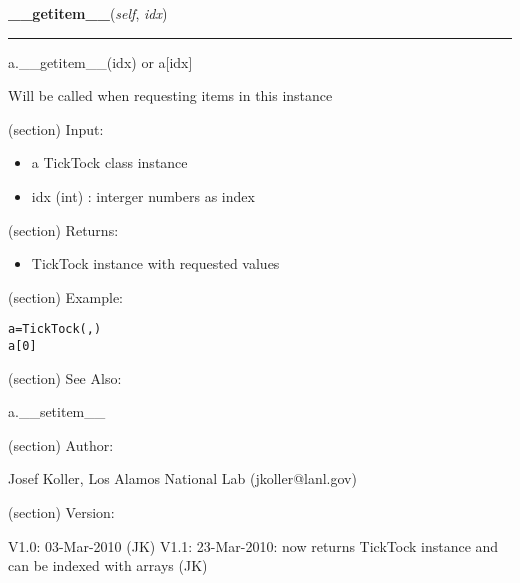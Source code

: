 \hspace{.8\funcindent}\begin{boxedminipage}{\funcwidth}

    \raggedright \textbf{\_\_getitem\_\_}(\textit{self}, \textit{idx})

    \vspace{-1.5ex}

    \rule{\textwidth}{0.5\fboxrule}
\setlength{\parskip}{2ex}
    a.\_\_getitem\_\_(idx) or a[idx]

    Will be called when requesting items in this instance

    (section) Input:

      \begin{itemize}
      \setlength{\parskip}{0.6ex}
        \item a TickTock class instance

        \item idx (int) : interger numbers as index

      \end{itemize}

    (section) Returns:

      \begin{itemize}
      \setlength{\parskip}{0.6ex}
        \item TickTock instance with requested values

      \end{itemize}

    (section) Example:

\begin{alltt}
\pysrcprompt{{\textgreater}{\textgreater}{\textgreater} }a = TickTock(, )
\pysrcprompt{{\textgreater}{\textgreater}{\textgreater} }a[0]
\end{alltt}
    (section) See Also:

      a.\_\_setitem\_\_

    (section) Author:

      Josef Koller, Los Alamos National Lab (jkoller@lanl.gov)

    (section) Version:

      V1.0: 03-Mar-2010 (JK) V1.1: 23-Mar-2010: now returns TickTock 
      instance and can be indexed with arrays (JK)

\setlength{\parskip}{1ex}
    \end{boxedminipage}

    \label{spacepy:spacetime:TickTock:__setitem__}

